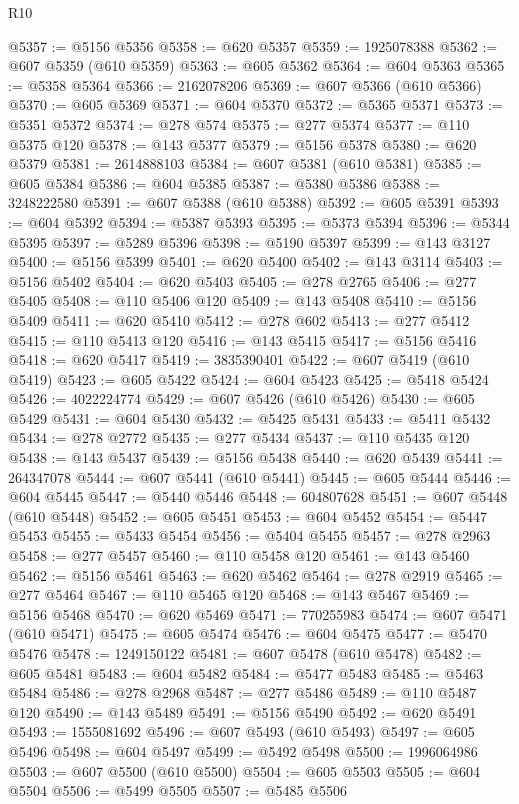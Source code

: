 \begin{lexlean}{R10}
\begin{coremodule}
{{{{{{{{{{{{{{{{{{{{{{{{{{{{{{{{{{{{{{{{{{{{{{{{{{{{{{{{{{{{{{{{{{{{{{{{{{{{{{{{{{{{@5357 := @5156 @5356
@5358 := @620 @5357
@5359 := 1925078388
@5362 := @607 @5359 (@610 @5359)
@5363 := @605 @5362
@5364 := @604 @5363
@5365 := @5358 @5364
@5366 := 2162078206
@5369 := @607 @5366 (@610 @5366)
@5370 := @605 @5369
@5371 := @604 @5370
@5372 := @5365 @5371
@5373 := @5351 @5372
@5374 := @278 @574
@5375 := @277 @5374
@5377 := @110 @5375 @120
@5378 := @143 @5377
@5379 := @5156 @5378
@5380 := @620 @5379
@5381 := 2614888103
@5384 := @607 @5381 (@610 @5381)
@5385 := @605 @5384
@5386 := @604 @5385
@5387 := @5380 @5386
@5388 := 3248222580
@5391 := @607 @5388 (@610 @5388)
@5392 := @605 @5391
@5393 := @604 @5392
@5394 := @5387 @5393
@5395 := @5373 @5394
@5396 := @5344 @5395
@5397 := @5289 @5396
@5398 := @5190 @5397
@5399 := @143 @3127
@5400 := @5156 @5399
@5401 := @620 @5400
@5402 := @143 @3114
@5403 := @5156 @5402
@5404 := @620 @5403
@5405 := @278 @2765
@5406 := @277 @5405
@5408 := @110 @5406 @120
@5409 := @143 @5408
@5410 := @5156 @5409
@5411 := @620 @5410
@5412 := @278 @602
@5413 := @277 @5412
@5415 := @110 @5413 @120
@5416 := @143 @5415
@5417 := @5156 @5416
@5418 := @620 @5417
@5419 := 3835390401
@5422 := @607 @5419 (@610 @5419)
@5423 := @605 @5422
@5424 := @604 @5423
@5425 := @5418 @5424
@5426 := 4022224774
@5429 := @607 @5426 (@610 @5426)
@5430 := @605 @5429
@5431 := @604 @5430
@5432 := @5425 @5431
@5433 := @5411 @5432
@5434 := @278 @2772
@5435 := @277 @5434
@5437 := @110 @5435 @120
@5438 := @143 @5437
@5439 := @5156 @5438
@5440 := @620 @5439
@5441 := 264347078
@5444 := @607 @5441 (@610 @5441)
@5445 := @605 @5444
@5446 := @604 @5445
@5447 := @5440 @5446
@5448 := 604807628
@5451 := @607 @5448 (@610 @5448)
@5452 := @605 @5451
@5453 := @604 @5452
@5454 := @5447 @5453
@5455 := @5433 @5454
@5456 := @5404 @5455
@5457 := @278 @2963
@5458 := @277 @5457
@5460 := @110 @5458 @120
@5461 := @143 @5460
@5462 := @5156 @5461
@5463 := @620 @5462
@5464 := @278 @2919
@5465 := @277 @5464
@5467 := @110 @5465 @120
@5468 := @143 @5467
@5469 := @5156 @5468
@5470 := @620 @5469
@5471 := 770255983
@5474 := @607 @5471 (@610 @5471)
@5475 := @605 @5474
@5476 := @604 @5475
@5477 := @5470 @5476
@5478 := 1249150122
@5481 := @607 @5478 (@610 @5478)
@5482 := @605 @5481
@5483 := @604 @5482
@5484 := @5477 @5483
@5485 := @5463 @5484
@5486 := @278 @2968
@5487 := @277 @5486
@5489 := @110 @5487 @120
@5490 := @143 @5489
@5491 := @5156 @5490
@5492 := @620 @5491
@5493 := 1555081692
@5496 := @607 @5493 (@610 @5493)
@5497 := @605 @5496
@5498 := @604 @5497
@5499 := @5492 @5498
@5500 := 1996064986
@5503 := @607 @5500 (@610 @5500)
@5504 := @605 @5503
@5505 := @604 @5504
@5506 := @5499 @5505
@5507 := @5485 @5506
}}}}}}}}}}}}}}}}}}}}}}}}}}}}}}}}}}}}}}}}}}}}}}}}}}}}}}}}}}}}}}}}}}}}}}}}}}}}}}}}}}}}
\end{coremodule}
\end{lexlean}
